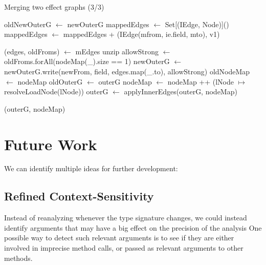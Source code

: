 \documentclass[a4paper]{article}
\begin{document}
\begin{algorithm}
    \ContinuedFloat
\caption{Merging two effect graphs (3/3)}\label{algo:pt:mergegraphs}
\begin{algorithmic}[1]
        \Repeat
            \State oldNewOuterG  $\gets$ newOuterG
            \State mappedEdges $\gets$ Set[(IEdge, Node)]()
                \State  mappedEdges $\gets$ mappedEdges + (IEdge(mfrom, ie.field, mto), v1)
            \EndFor

                \State (edges, oldFroms) $\gets$ mEdges unzip
                \State allowStrong $\gets$ oldFroms.forAll(nodeMap(\_).size == 1)
                \State
                \State newOuterG $\gets$ newOuterG.write(newFrom, field, edges.map(\_.to), allowStrong)
            \EndFor
    \EndFunction
    \State
    \Repeat
        \State oldNodeMap $\gets$ nodeMap
        \State oldOuterG  $\gets$ outerG
            \State nodeMap $\gets$ nodeMap ++ (lNode $\mapsto$ resolveLoadNode(lNode))
        \EndFor
        \State outerG $\gets$ applyInnerEdges(outerG, nodeMap)

    \State \Return (outerG, nodeMap)

\EndFunction
\end{algorithmic}
\end{algorithm}

\FloatBarrier

\section{Future Work}
We can identify multiple ideas for further development:

\subsection{Refined Context-Sensitivity}
\label{refinedcontextsensitivity}
Instead of reanalyzing whenever the type signature changes, we could instead
identify arguments that may have a big effect on the precision of the analysis
One possible way to detect such relevant arguments is to see if they are either
involved in imprecise method calls, or passed as relevant arguments to other
methods.
\end{document}
